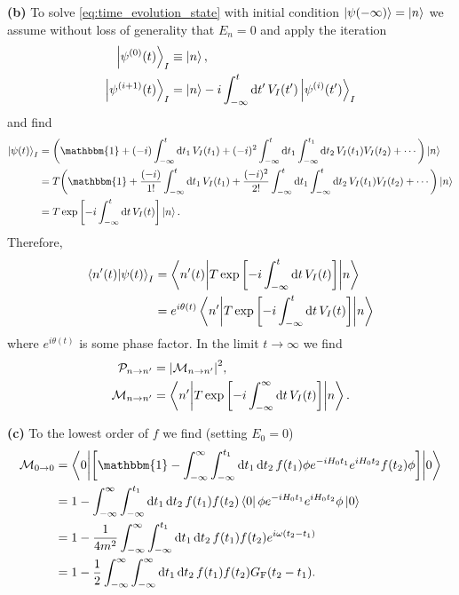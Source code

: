 \documentclass{article}
\makeatletter
\newcommand*{\shifttext}[1]{%
  \settowidth{\@tempdima}{#1}%
  \hspace{-\@tempdima}#1%
}
\newcommand{\plabel}[1]{%
\shifttext{\textbf{#1}\quad}%
}
\makeatother
\begin{document}
\plabel{(b)}%
To solve \cref{eq:time_evolution_state} with initial condition $\ket{\psi(-\infty)} = \ket{n}$ we assume without loss of generality that $E_n = 0$ and apply the iteration
\begin{align*}
    \ket{\psi^{(0)}(t)}_I &\equiv \ket{n}, \\
    \ket{\psi^{(i+1)}(t)}_I &= \ket{n} -i\int_{-\infty}^t \dd{t'} V_I(t') \ket{\psi^{(i)}(t')}_I
\end{align*}
and find
\begin{align*}
    \ket{\psi(t)}_I &= \qty(\mathbbm{1} + (-i) \int_{-\infty}^t \dd{t_1} V_I(t_1) + (-i)^2 \int_{-\infty}^t \dd{t_1} \int_{-\infty}^{t_1} \dd{t_2} V_I(t_1) V_I(t_2) + \cdots) \ket{n} \\
    &= T\qty(\mathbbm{1} + \frac{(-i)}{1!} \int_{-\infty}^t \dd{t_1} V_I(t_1) + \frac{(-i)^2}{2!} \int_{-\infty}^t \dd{t_1} \int_{-\infty}^{t} \dd{t_2} V_I(t_1) V_I(t_2) + \cdots) \ket{n} \\
    &= T \exp\qty[-i \int_{-\infty}^t \dd{t} V_I(t)] \ket{n}.
\end{align*}
Therefore,
\begin{align*}
    \bra{n'(t)}\ket{\psi(t)}_I &= \mel**{n'(t)}{T \exp\qty[-i \int_{-\infty}^t \dd{t} V_I(t)]}{n} \\
    &= e^{i\theta(t)}\mel**{n'}{T \exp\qty[-i \int_{-\infty}^t \dd{t} V_I(t)]}{n}
\end{align*}
where $e^{i\theta(t)}$ is some phase factor.
In the limit $t\rightarrow \infty$ we find
\begin{align*}
    \mathcal{P}_{n\rightarrow n'} &= \abs{\mathcal{M}_{n\rightarrow n'}}^2, \\
    \mathcal{M}_{n\rightarrow n'} &= \mel**{n'}{T \exp\qty[-i \int_{-\infty}^\infty \dd{t} V_I(t)]}{n}.
\end{align*}

\plabel{(c)}%
To the lowest order of $f$ we find (setting $E_0 = 0$)
\begin{align*}
    \mathcal{M}_{0\rightarrow 0} &= \mel**{0}{\qty[\mathbbm{1} - \int_{-\infty}^{\infty} \int_{-\infty}^{t_1} \dd{t_1} \dd{t_2} f(t_1)\phi e^{-iH_0 t_1}e^{iH_0 t_2} f(t_2)\phi ]}{0} \\
    &= 1 - \int_{-\infty}^{\infty} \int_{-\infty}^{t_1} \dd{t_1} \dd{t_2} f(t_1) f(t_2) \bra{0} \phi e^{-iH_0 t_1} e^{iH_0 t_2} \phi \ket{0} \\
    &= 1 - \frac{1}{4m^2} \int_{-\infty}^{\infty} \int_{-\infty}^{t_1} \dd{t_1} \dd{t_2} f(t_1) f(t_2) e^{i\omega(t_2 - t_1)} \\
    &= 1 - \frac{1}{2} \int_{-\infty}^\infty \int_{-\infty}^\infty \dd{t_1} \dd{t_2} f(t_1) f(t_2) G_{\mathrm{F}}(t_2 - t_1).
\end{align*}
\end{document}
